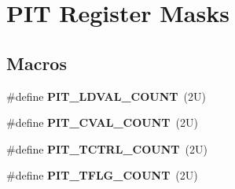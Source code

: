 \hypertarget{group___p_i_t___register___masks}{}\section{P\+IT Register Masks}
\label{group___p_i_t___register___masks}
\subsection*{Macros}
\begin{DoxyCompactItemize}
\item 
\mbox{\label{group___p_i_t___register___masks_ga3d2d70f366f2b214ae060c0cb0abb202}} 
\#define {\bfseries P\+I\+T\+\_\+\+L\+D\+V\+A\+L\+\_\+\+C\+O\+U\+NT}~(2\+U)
\item 
\mbox{\label{group___p_i_t___register___masks_ga8620fe2fb28dc11a864333f6ef51b9bd}} 
\#define {\bfseries P\+I\+T\+\_\+\+C\+V\+A\+L\+\_\+\+C\+O\+U\+NT}~(2\+U)
\item 
\mbox{\label{group___p_i_t___register___masks_gaf5d79447f057663c2cf041cb472bd2b3}} 
\#define {\bfseries P\+I\+T\+\_\+\+T\+C\+T\+R\+L\+\_\+\+C\+O\+U\+NT}~(2\+U)
\item 
\mbox{\label{group___p_i_t___register___masks_ga7d2129ae649e32ec8c7e6804ba6b6551}} 
\#define {\bfseries P\+I\+T\+\_\+\+T\+F\+L\+G\+\_\+\+C\+O\+U\+NT}~(2\+U)
\end{DoxyCompactItemize}
